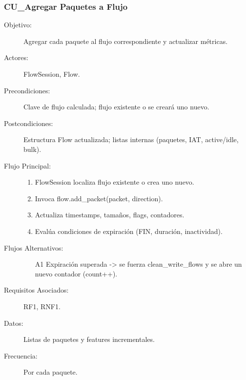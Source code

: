 \subsubsection{CU\_Agregar Paquetes a Flujo}
\begin{description}
  \item[Objetivo:] Agregar cada paquete al flujo correspondiente y actualizar métricas.
  \item[Actores:] FlowSession, Flow.
  \item[Precondiciones:] Clave de flujo calculada; flujo existente o se creará uno nuevo.
  \item[Postcondiciones:] Estructura Flow actualizada; listas internas (paquetes, IAT, active/idle, bulk).
  \item[Flujo Principal:]
    \begin{enumerate}
      \item FlowSession localiza flujo existente o crea uno nuevo.
      \item Invoca flow.add\_packet(packet, direction).
      \item Actualiza timestamps, tamaños, flags, contadores.
      \item Evalúa condiciones de expiración (FIN, duración, inactividad).
    \end{enumerate}
  \item[Flujos Alternativos:]
    \begin{enumerate}
      \item[A1] Expiración superada -> se fuerza clean\_write\_flows y se abre un nuevo contador (count++).
    \end{enumerate}
  \item[Requisitos Asociados:] RF1, RNF1.
  \item[Datos:] Listas de paquetes y features incrementales.
  \item[Frecuencia:] Por cada paquete.
\end{description}

